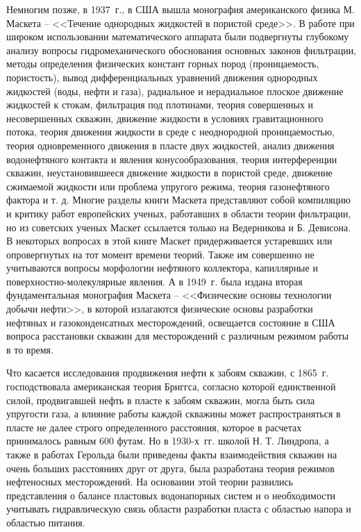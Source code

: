Немногим позже, в 1937~г., в США вышла монография американского физика М. Маскета -- <<Течение однородных жидкостей в пористой среде>>. В работе при широком использовании математического аппарата были подвергнуты глубокому 
анализу вопросы гидромеханического обоснования основных законов фильтрации, методы определения физических констант горных пород (проницаемость, пористость), вывод дифференциальных уравнений движения однородных жидкостей
(воды, нефти и газа), радиальное и нерадиальное плоское движение жидкостей к стокам, фильтрация под плотинами, теория совершенных и несовершенных скважин, движение жидкости в условиях гравитационного потока, теория движения
жидкости в среде с неоднородной проницаемостью, теория одновременного движения в пласте двух жидкостей, анализ движения водонефтяного контакта и явления конусообразования, теория интерференции скважин, неустановившееся
движение жидкости в пористой среде, движение сжимаемой жидкости или проблема упругого режима, теория газонефтяного фактора и т. д. Многие разделы книги Маскета представляют собой компиляцию и критику работ европейских
ученых, работавших в области теории фильтрации, но из советских ученых Маскет ссылается только на Ведерникова и Б. Девисона. В некоторых вопросах в этой книге Маскет придерживается устаревших или опровергнутых на тот момент 
времени теорий. Также им совершенно не учитываются вопросы морфологии нефтяного коллектора, капиллярные и поверхностно-молекулярные явления. А в 1949~г. была издана вторая фундаментальная монография 
Маскета -- <<Физические основы технологии добычи нефти>>, в которой излагаются физические основы разработки нефтяных и газоконденсатных месторождений, освещается состояние в США вопроса расстановки скважин для месторождений
с различным режимом работы в то время.

Что касается исследования продвижения нефти к забоям скважин, с 1865~г. господствовала американская теория Бриггса, согласно которой единственной силой, продвигавшей нефть в пласте к забоям скважин, могла быть сила
упругости газа, а влияние работы каждой скважины может распространяться в пласте не далее строго определенного расстояния, которое в расчетах принималось равным 600 футам.
Но в 1930-х~гг. школой Н. Т. Линдропа, а также в работах Герольда были приведены факты взаимодействия скважин на очень больших расстояниях друг от друга, была разработана теория режимов нефтеносных месторождений.
На основании этой теории развились представления о балансе пластовых водонапорных систем и о необходимости учитывать гидравлическую связь области разработки пласта с областью напора и областью питания.

